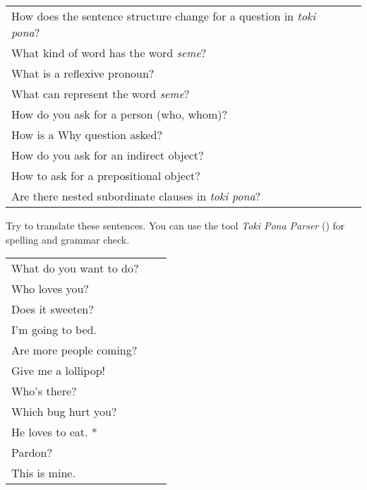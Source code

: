 \begin{supertabular}{p{5,5cm}|ll}
    How does the sentence structure change for a question in \textit{toki pona}? &  & \\ %
    What kind of word has the word \textit{seme}?                                &  & \\ %
    What is a reflexive pronoun?                                                 &  & \\ %
    What can represent the word \textit{seme}?                                   &  & \\ %
    How do you ask for a person (who, whom)?                                     &  & \\ %
    How is a Why question asked?                                                 &  & \\ %
    How do you ask for an indirect object?                                       &  & \\ %
    How to ask for a prepositional object?                                       &  & \\ %
    Are there nested subordinate clauses in \textit{toki pona}?                  &  & \\ %
\end{supertabular}

Try to translate these sentences.
You can use the tool \textit{Toki Pona Parser} (\cite{www:rowa:02}) for spelling and grammar check.

\begin{supertabular}{p{5,5cm}|ll}
    What do you want to do? &  & \\ %
    Who loves you?          &  & \\ %
    Does it sweeten?        &  & \\ %
    I'm going to bed.       &  & \\  %
    Are more people coming? &  & \\  %
    Give me a lollipop!     &  & \\   %
    Who's there?            &  & \\ %
    Which bug hurt you?     &  & \\ %
    He loves to eat. *      &  & \\ %
    Pardon?                 &  & \\ %
    This is mine.           &  & \\ %
\end{supertabular}

